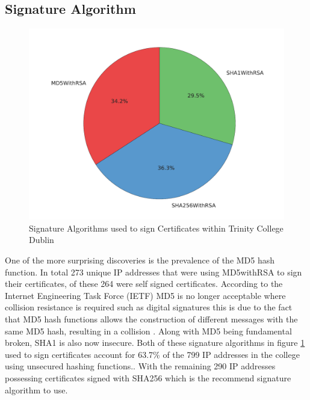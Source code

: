 \documentclass[a4wide,leqno,12pt]{report}
\begin{document}
\subsection{Signature Algorithm}
\begin{figure}[H]
\centering
\includegraphics[scale=.5]{pdf_images/signatureAlgorithms}
\caption{Signature Algorithms used to sign Certificates within Trinity College Dublin}
\label{fig:signatureAlgorithms}
\end{figure}

One of the more surprising discoveries is the prevalence of the MD5 hash function. In total 273 unique IP addresses that were using MD5withRSA to sign their certificates, of these 264 were self signed certificates. According to the Internet Engineering Task Force (IETF) MD5 is no longer acceptable where collision resistance is required
such as digital signatures \cite{turner2011updated} this is due to the fact that MD5 hash functions allows the construction of different messages with the same MD5 hash,  resulting in a collision \cite{md5}. Along with MD5 being fundamental broken, SHA1 is also now insecure. Both of these signature algorithms in figure \ref{fig:signatureAlgorithms} used to sign certificates account for 63.7\% of the 799 IP addresses in the college using unsecured hashing functions.\cite{ssllabs}. With the remaining 290 IP addresses possessing certificates signed with SHA256 which is the recommend signature algorithm to use\cite{ssllabs}.
\end{document}
